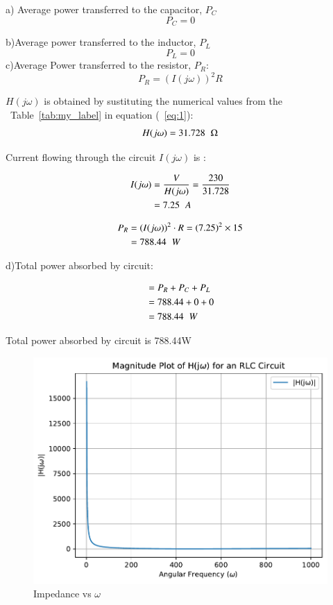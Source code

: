 \documentclass[journal,12pt,twocolumn]{IEEEtran}
\newcommand\tabref{Table~\ref}
\providecommand{\brak}[1]{\ensuremath{\left(#1\right)}}
\theoremstyle{remark}
\begin{document}
a) Average power transferred to the capacitor, $P_C$ 
\begin{equation}
	P_C = 0
\end{equation}	
  
b)Average power transferred to the inductor, $P_L$
\begin{equation}
	P_L = 0
\end{equation}
c)Average Power transferred to the resistor, $P_R$:
\begin{equation}
	P_R = (I(j\omega))^2R
\end{equation} 


$H(j\omega)$ is obtained by sustituting the numerical values from the ~\tabref{tab:my_label} in equation (~\ref{eq:1}):
 \begin{align}
 H(j\omega)=31.728\hspace{0.2cm}\ohm
\end{align}	



Current flowing through the circuit $I(j\omega)$ is :

\begin{align}
	I(j\omega)&=\frac{V}{H(j\omega)}=\frac{230}{31.728}
	\\&=7.25\hspace{0.2cm}A
\end{align}

\begin{align}
	P_R &= (I(j\omega))^2\cdot R = \brak{7.25}^2 \times 15
	\\&=788.44\hspace{0.2cm}W
\end{align}



d)Total power absorbed by circuit:

\begin{align}
	&= P_R + P_C + P_L
	\\&= 788.44 + 0 + 0
	\\&= 788.44\hspace{0.2cm}W
\end{align}

Total power absorbed by circuit is 788.44\hspace{0.01cm}W

\vspace{1cm}

\begin{figure}[h!]
	\centering
	\includegraphics[width=\columnwidth]{figs/magnitude_plot.pdf}
	\caption{Impedance vs $\omega$}
	\label{fig:magnitude_plot}
\end{figure}

 
\end{document}
